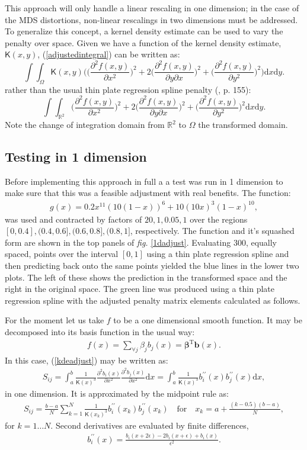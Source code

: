 \documentclass[a4paper,10pt]{article}
\newcommand{\fig}[1]{\emph{fig.} \ref{#1}}
\newcommand{\eqn}[1]{(\ref{#1})}
\newcommand{\tr}[1]{#1^{\text{T}}}
\newcommand{\be}{\begin{eqnarray}}
\newcommand{\ee}{\end{eqnarray}}
\newcommand{\tprs}{thin plate regression spline }
\begin{document}
This approach will only handle a linear rescaling in one dimension; in the case of the MDS distortions, non-linear rescalings in two dimensions must be addressed. To generalize this concept, a kernel density estimate can be used to vary the penalty over space. Given we have a function of the kernel density estimate, $\mathsf{K}(x,y)$, \eqn{adjustedintegral} can be written as:
\begin{equation}
\int\int_\Omega \mathsf{K}(x,y) \Big( \Big(\frac{\partial^2 f(x,y)}{\partial x^2}\Big)^2 + 2\Big(\frac{\partial^2 f(x,y)}{\partial y \partial x}\Big)^2 + \Big(\frac{\partial^2 f(x,y)}{\partial y^2}\Big)^2\Big) \text{d}x\text{d}y.
\label{kdeadjust}
\end{equation}
rather than the usual thin plate regression spline penalty (\cite{simonbook}, p. 155):
\begin{equation}
\int\int_{\mathbb{R}^2} \Big(\frac{\partial^2 f(x,y)}{\partial x^2}\Big)^2 + 2\Big(\frac{\partial^2 f(x,y)}{\partial y \partial x}\Big)^2 + \Big(\frac{\partial^2 f(x,y)}{\partial y^2}\Big)^2 \text{d}x\text{d}y.
\end{equation}
Note the change of integration domain from $\mathbb{R}^2$ to $\Omega$ the transformed domain.

\subsection{Testing in 1 dimension}

Before implementing this approach in full a a test was run in 1 dimension to make sure that this was a feasible adjustment with real benefits. The function:
\be
g(x)=0.2x^{11}(10(1-x))^6+10(10x)^3(1-x)^{10},
\ee
was used and contracted by factors of $20,1,0.05,1$ over the regions $[0,0.4], (0.4,0.6],(0.6,0.8],(0.8,1]$, respectively. The function and it's squashed form are shown in the top panels of \fig{1dadjust}. Evaluating 300, equally spaced, points over the interval $[0,1]$ using a thin plate regression spline and then predicting back onto the same points yielded the blue lines in the lower two plots. The left of these shows the prediction in the transformed space and the right in the original space. The green line was produced using a \tprs with the adjusted penalty matrix elements calculated as follows.

For the moment let us take $f$ to be a one dimensional smooth function. It may be decomposed into its basis function in the usual way:
\be
f(x)=\sum_{\forall j} \beta_j b_j(x) = \tr{\mathbf{\beta}}\mathbf{b}(x).
\ee
In this case, \eqn{kdeadjust} may be written as:
\be
S_{ij}= \int_a^b \frac{1}{\mathsf{K}(x)^3} \frac{\partial^2 b_i(x)}{\partial x^2}\frac{\partial^2 b_j(x)}{\partial x^2} \text{d}x = \int_a^b \frac{1}{\mathsf{K}(x)^3} b^{\prime\prime}_i(x) b^{\prime\prime}_j(x) \text{d}x,
\ee
in one dimension. It is approximated by the midpoint rule as:
\be
S_{ij}= \frac{b-a}{N}\sum_{k=1}^N \frac{1}{\mathsf{K}(x_k)^3} b^{\prime\prime}_i(x_k) b^{\prime\prime}_j(x_k) \quad \text{for} \quad x_k=a+\frac{(k-0.5)(b-a)}{N},
\ee
for $k=1\dots N$. Second derivatives are evaluated by finite differences,
\be
\label{bfinitediff}
b^{\prime\prime}_i(x) = \frac{ b_i(x+2\epsilon) - 2b_i(x+\epsilon) + b_i(x)}{\epsilon^2}.
\ee
\end{document}
